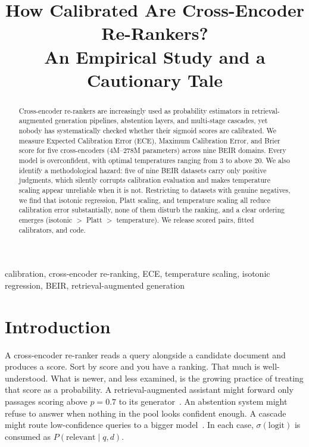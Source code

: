 \documentclass[conference]{IEEEtran}
\title{How Calibrated Are Cross-Encoder Re-Rankers?\\
An Empirical Study and a Cautionary Tale}
\author{
  \IEEEauthorblockN{Sayanjib [Surname]}
  \IEEEauthorblockA{[Affiliation]\\
  [City, Country]\\
  \texttt{[email]}}
}
\newcommand{\sigmoid}{\sigma}
\begin{document}
\maketitle

\begin{abstract}
Cross-encoder re-rankers are increasingly used as probability estimators in
retrieval-augmented generation pipelines, abstention layers, and multi-stage
cascades, yet nobody has systematically checked whether their sigmoid scores
are calibrated. We measure Expected Calibration Error (ECE), Maximum
Calibration Error, and Brier score for five cross-encoders (4M--278M
parameters) across nine BEIR domains. Every model is overconfident, with
optimal temperatures ranging from 3 to above 20. We also identify a
methodological hazard: five of nine BEIR datasets carry only positive
judgments, which silently corrupts calibration evaluation and makes
temperature scaling appear unreliable when it is not. Restricting to datasets
with genuine negatives, we find that isotonic regression, Platt scaling, and
temperature scaling all reduce calibration error substantially, none of them
disturb the ranking, and a clear ordering emerges (isotonic $>$ Platt $>$
temperature). We release scored pairs, fitted calibrators, and code.
\end{abstract}

\begin{IEEEkeywords}
calibration, cross-encoder re-ranking, ECE, temperature scaling, isotonic
regression, BEIR, retrieval-augmented generation
\end{IEEEkeywords}

\section{Introduction}
\label{sec:intro}

A cross-encoder re-ranker reads a query alongside a candidate document and
produces a score. Sort by score and you have a ranking. That much is
well-understood. What is newer, and less examined, is the growing practice of
treating that score as a probability. A retrieval-augmented assistant might
forward only passages scoring above $p=0.7$ to its generator~\cite{lewis2020rag}.
An abstention system might refuse to answer when nothing in the pool looks
confident enough. A cascade might route low-confidence queries to a bigger
model~\cite{gao2024rag}. In each case, $\sigmoid(\text{logit})$ is consumed
as $P(\text{relevant}\mid q,d)$.
\end{document}
